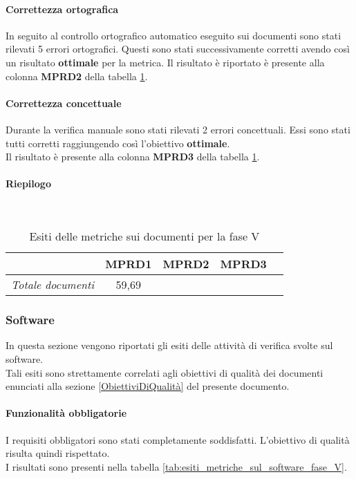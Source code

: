 \documentclass[../PianoDiQualifica.tex]{subfiles}
\begin{document}
\begin{appendices}
			\paragraph{Correttezza ortografica}
			In seguito al controllo ortografico automatico eseguito sui documenti sono stati rilevati 5 errori ortografici. Questi sono stati successivamente corretti avendo così un risultato \textbf{ottimale} per la metrica.
			Il risultato è riportato è presente alla colonna \textbf{MPRD2} della tabella \ref{tab:esiti_metriche_sui_documenti_fase_V}.  
			
			
			\paragraph{Correttezza concettuale}
			 Durante la verifica manuale sono stati rilevati 2 errori concettuali. Essi sono stati tutti corretti raggiungendo così l'obiettivo \textbf{ottimale}.\\
			 Il risultato è presente alla colonna \textbf{MPRD3} della tabella \ref{tab:esiti_metriche_sui_documenti_fase_V}.  
			
			\paragraph{Riepilogo}\
			\begin{table}[H]
				\centering
				\begin{tabular}{l * {4}{c}}
					\toprule
					  & \textbf{MPRD1} & \textbf{MPRD2} & \textbf{MPRD3}\\
					\midrule
					\textit{Totale documenti} & 59,69 & \color{dkgreen}{0\%} & \color{dkgreen}{0\%} \\
					\bottomrule
				\end{tabular}
				\caption{Esiti delle metriche sui documenti per la fase V}
				\label{tab:esiti_metriche_sui_documenti_fase_V}
			\end{table}
			
			
		\subsubsection{Software}
		In questa sezione vengono riportati gli esiti delle attività di verifica svolte sul software.\\
		Tali esiti sono strettamente correlati agli obiettivi di qualità dei documenti enunciati alla sezione \ref{ObiettiviDiQualità} del presente documento.
		
			\paragraph{Funzionalità obbligatorie}
			I requisiti obbligatori sono stati completamente soddisfatti.
			L'obiettivo di qualità risulta quindi rispettato.\\
			I risultati sono presenti nella tabella \ref{tab:esiti_metriche_sul_software_fase_V}.
			

\end{appendices}
\end{document}

